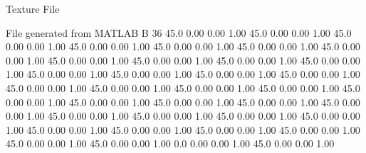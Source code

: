 Texture File

File generated from MATLAB
B 36
   45.0   0.00   0.00  1.00
   45.0   0.00   0.00  1.00
   45.0   0.00   0.00  1.00
   45.0   0.00   0.00  1.00
   45.0   0.00   0.00  1.00
   45.0   0.00   0.00  1.00
   45.0   0.00   0.00  1.00
   45.0   0.00   0.00  1.00
   45.0   0.00   0.00  1.00
   45.0   0.00   0.00  1.00
   45.0   0.00   0.00  1.00
   45.0   0.00   0.00  1.00
   45.0   0.00   0.00  1.00
   45.0   0.00   0.00  1.00
   45.0   0.00   0.00  1.00
   45.0   0.00   0.00  1.00
   45.0   0.00   0.00  1.00
   45.0   0.00   0.00  1.00
   45.0   0.00   0.00  1.00
   45.0   0.00   0.00  1.00
   45.0   0.00   0.00  1.00
   45.0   0.00   0.00  1.00
   45.0   0.00   0.00  1.00
   45.0   0.00   0.00  1.00
   45.0   0.00   0.00  1.00
   45.0   0.00   0.00  1.00
   45.0   0.00   0.00  1.00
   45.0   0.00   0.00  1.00
   45.0   0.00   0.00  1.00
   45.0   0.00   0.00  1.00
   45.0   0.00   0.00  1.00
   45.0   0.00   0.00  1.00
   45.0   0.00   0.00  1.00
   45.0   0.00   0.00  1.00
    0.0   0.00   0.00  1.00
   45.0   0.00   0.00  1.00
